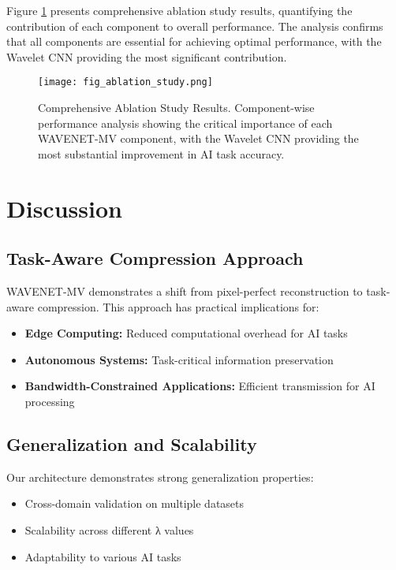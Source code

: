 \documentclass[conference]{IEEEtran}
\begin{document}
Figure \ref{fig:ablation_study} presents comprehensive ablation study results, quantifying the contribution of each component to overall performance. The analysis confirms that all components are essential for achieving optimal performance, with the Wavelet CNN providing the most significant contribution.

\begin{figure}[htbp]
\centering
\texttt{[image: fig\_ablation\_study.png]}
\caption{Comprehensive Ablation Study Results. Component-wise performance analysis showing the critical importance of each WAVENET-MV component, with the Wavelet CNN providing the most substantial improvement in AI task accuracy.}
\label{fig:ablation_study}
\end{figure}

\section{Discussion}

\subsection{Task-Aware Compression Approach}

WAVENET-MV demonstrates a shift from pixel-perfect reconstruction to task-aware compression. This approach has practical implications for:

\begin{itemize}
\item \textbf{Edge Computing:} Reduced computational overhead for AI tasks
\item \textbf{Autonomous Systems:} Task-critical information preservation
\item \textbf{Bandwidth-Constrained Applications:} Efficient transmission for AI processing
\end{itemize}

\subsection{Generalization and Scalability}

Our architecture demonstrates strong generalization properties:
\begin{itemize}
\item Cross-domain validation on multiple datasets
\item Scalability across different λ values
\item Adaptability to various AI tasks
\end{itemize}
\end{document}

